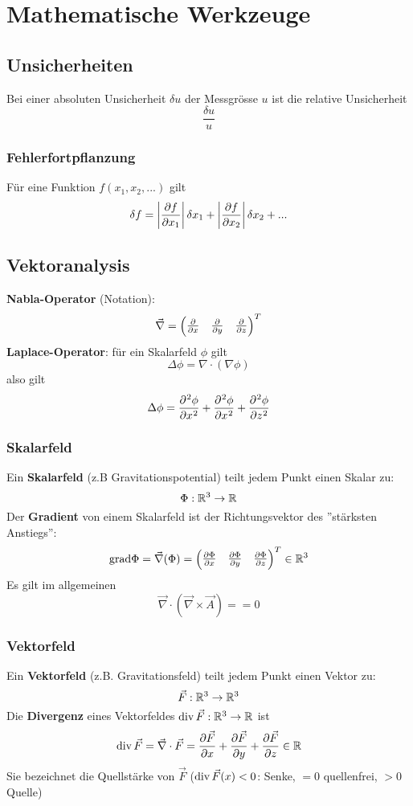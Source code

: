 \section{Mathematische Werkzeuge}
\subsection{Unsicherheiten}
Bei einer absoluten Unsicherheit $\delta u$  der Messgrösse $u$ ist die relative Unsicherheit
$$\frac{\delta u}{u}$$

\subsubsection{Fehlerfortpflanzung}
Für eine Funktion $f(x_1, x_2, ...)$ gilt
$$\delta f = \abs{\diffp{f}{x_1}}\delta x_1 + \abs{\diffp{f}{x_2}} \delta x_2 + ...$$

\subsection{Vektoranalysis}
\textbf{Nabla-Operator} (Notation):
$$\Vec{\nabla} = \begin{pmatrix}\diffp{}{x}& \diffp{}{y} & \diffp{}{z}\end{pmatrix}^T$$
\textbf{Laplace-Operator}: für ein Skalarfeld $\phi$ gilt
\[\Delta \phi = \nabla\cdot(\nabla \phi)\]
also gilt
\[\Delta \phi = \diffp[2]{\phi}{x} + \diffp[2]{\phi}{x} + \diffp[2]{\phi}{z}\]

\subsubsection{Skalarfeld}
Ein \textbf{Skalarfeld} (z.B Gravitationspotential) teilt jedem Punkt einen Skalar zu:
$$\Phi: \mathbb{R}^3 \to \mathbb{R}$$
Der \textbf{Gradient} von einem Skalarfeld ist der Richtungsvektor des ''stärksten Anstiegs'':
$$\text{grad} \Phi = \Vec{\nabla}(\Phi) = \begin{pmatrix}\diffp{\Phi}{x}& \diffp{\Phi}{y} & \diffp{\Phi}{z}\end{pmatrix}^T \in \R^3$$
Es gilt im allgemeinen
$$\Vec{\nabla} \cdot (\Vec{\nabla} \times \Vec{A}) =  = 0$$

\subsubsection{Vektorfeld}
Ein \textbf{Vektorfeld} (z.B. Gravitationsfeld) teilt jedem Punkt einen Vektor zu:
$$\Vec{F}: \mathbb{R}^3 \to \mathbb{R}^3$$
Die \textbf{Divergenz} eines Vektorfeldes $\operatorname{div}\Vec{F}: \mathbb{R}^3 \to \mathbb{R}$ ist
$$\divergence \Vec{F} = \Vec{\nabla} \cdot \Vec{F} = \diffp{\Vec{F}}{x} + \diffp{\Vec{F}}{y} + \diffp{\Vec{F}}{z} \in \R$$
Sie bezeichnet die Quellstärke von $\Vec{F}$ ($\operatorname{div} \Vec{F}(x) < 0$: Senke, $=0$ quellenfrei, $>0$ Quelle)

